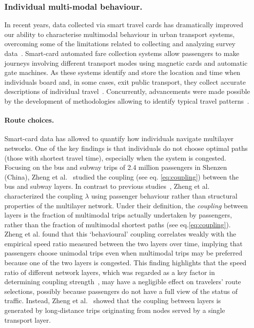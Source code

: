 \subsubsection{Individual multi-modal behaviour.}
In recent years, data collected via smart travel cards has dramatically improved our ability to characterise multimodal behaviour in urban transport systems, overcoming some of the limitations related to collecting and analyzing survey data~\cite{chen2016promises,zannat2019emerging}. Smart-card automated fare collection systems allow passengers to make journeys involving different transport modes using magnetic cards and automatic gate machines. As these systems identify and store the location and time when individuals board and, in some cases, exit public transport, they collect accurate descriptions of individual travel~\cite{pelletier2011smart}. Concurrently, advancements were made possible by the development of methodologies allowing to identify typical travel patterns~\cite{ma2013mining}.

\paragraph{Route choices.} 
Smart-card data has allowed to quantify how individuals navigate multilayer networks. One of the key findings is that individuals do not choose optimal paths (those with shortest travel time), especially when the system is congested. Focusing on the bus and subway trips of 2.4 million passengers in Shenzen (China), Zheng et al.~\cite{zheng2018coupling} studied the coupling (see eq. \ref{eq:coupling}) between the bus and subway layers. In contrast to previous studies~\cite{strano2015features}, Zheng et al.~\cite{zheng2018coupling} characterized the coupling $\lambda$ using passenger behaviour rather than structural properties of the multilayer network. Under their definition, the \emph{coupling} between layers is the fraction of multimodal trips actually undertaken by passengers, rather than the fraction of multimodal shortest paths (see eq.\ref{eq:coupling}). Zheng et al. found that this `behavioural' coupling correlates weakly with the empirical speed ratio measured between the two layers over time, implying that passengers choose unimodal trips even when multimodal trips may be preferred because one of the two layers is congested. This finding highlights that the speed ratio of different network layers, which was regarded as a key factor in determining coupling strength~\cite{strano2015features,chodrow2016congestion}, may have a negligible effect on travelers’ route selections, possibly because passengers do not have a full view of the status of traffic. Instead, Zheng et al.~\cite{zheng2018coupling} showed that the coupling between layers is generated by long-distance trips originating from nodes served by a single transport layer.


